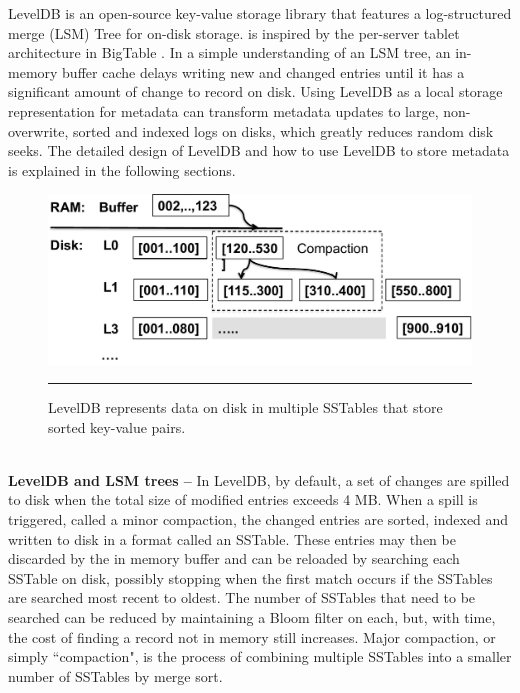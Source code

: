LevelDB \cite{LevelDB} is an open-source key-value storage library
that features a log-structured merge (LSM) Tree \cite{ONeil1996} for on-disk 
storage.
\ldb is inspired by the per-server tablet architecture in BigTable
\cite{BigTable}.
In a simple understanding of an LSM tree, an in-memory buffer cache delays 
writing new and changed entries until it has a significant amount of change to 
record on disk.
Using LevelDB as a local storage representation for metadata  
can transform metadata updates to large, non-overwrite, sorted and indexed logs on disks,
which greatly reduces random disk seeks.
The detailed design of LevelDB and how to use LevelDB to store metadata is
explained in the following sections.

\begin{figure}[t]
\centering
\includegraphics[scale=0.4]{figs/leveldb}
\caption{\normalsize
LevelDB represents data on disk in multiple SSTables that store sorted key-value pairs.}
\vspace{10pt}
\hrule 
\label{fig:leveldb}
\end{figure}


~\\
\textbf{LevelDB and LSM trees -- }
In LevelDB, by default, a set of changes are spilled to disk when the total
size of modified entries exceeds 4 MB.  When a spill is triggered, called a
minor compaction, the changed entries are sorted, indexed and written to disk
in a format called an SSTable\cite{BigTable}.  These entries may then be
discarded by the in memory buffer and can be reloaded by searching each SSTable
on disk, possibly stopping when the first match occurs if the SSTables are
searched most recent to oldest.  The number of SSTables that need to be
searched can be reduced by maintaining a Bloom filter\cite{bloomfilter} on
each, but, with time, the cost of finding a record not in memory still increases.  Major compaction, or simply ``compaction", is the process of combining multiple SSTables into a smaller number of SSTables by merge sort. 

